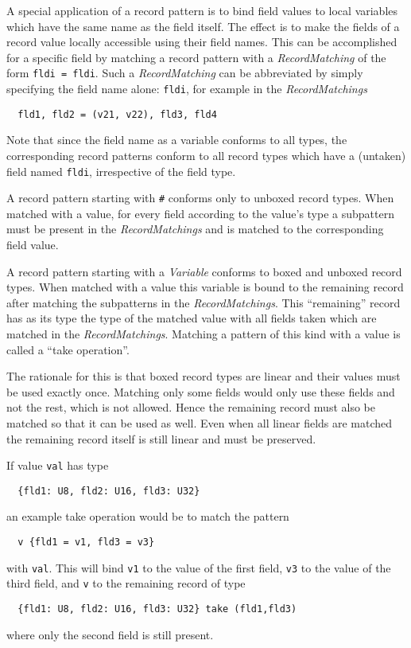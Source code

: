 \documentclass[a4paper]{report}
\newcommand{\code}[1]{\textnormal{\texttt{#1}}}
\begin{document}
A special application of a record pattern is to bind field values to local variables which have the same name as the field itself. The effect 
is to make the fields of a record value locally accessible using their field names. This can be accomplished for a specific field by matching 
a record pattern with a \textit{RecordMatching} of the form \code{fldi = fldi}. Such a \textit{RecordMatching} can be abbreviated by simply 
specifying the field name alone: \code{fldi}, for example in the \textit{RecordMatchings}
\begin{verbatim}
  fld1, fld2 = (v21, v22), fld3, fld4
\end{verbatim}
Note that since the field name as a variable conforms to all types, the corresponding record patterns conform to all record types which have a 
(untaken) field named \code{fldi}, irrespective of the field type.



A record pattern starting with \code{\#} conforms only to unboxed record types. When matched with a value,  for every 
field according to the value's type a subpattern must be present in the 
\textit{RecordMatchings} and is matched to the corresponding field value. 

A record pattern starting with a \textit{Variable} conforms  to boxed and unboxed record types. 
When matched with a value this variable is bound to the 
remaining record after matching the subpatterns in the \textit{RecordMatchings}. 
This ``remaining'' record has as its type the type of the 
matched value with all fields taken which are matched in the \textit{RecordMatchings}.  Matching
a pattern of this kind with a value is called a ``take operation''. 

The rationale for this is that boxed record types are 
linear and their values must be used exactly once. Matching only some fields would only use these 
fields and not the rest, which is not allowed. 
Hence the remaining record must also be matched so that it can be used as well. 
Even when all linear fields are matched the remaining 
record itself is still linear and must be preserved.


If value \code{val} has type 
\begin{verbatim}
  {fld1: U8, fld2: U16, fld3: U32}
\end{verbatim}
an example take operation would be to match the pattern 
\begin{verbatim}
  v {fld1 = v1, fld3 = v3}
\end{verbatim}
with \code{val}. This will bind \code{v1} to the value of the first field, \code{v3} to the value of the
third field, and \code{v} to the remaining record of type
\begin{verbatim}
  {fld1: U8, fld2: U16, fld3: U32} take (fld1,fld3)
\end{verbatim}
where only the second field is still present.
\end{document}
